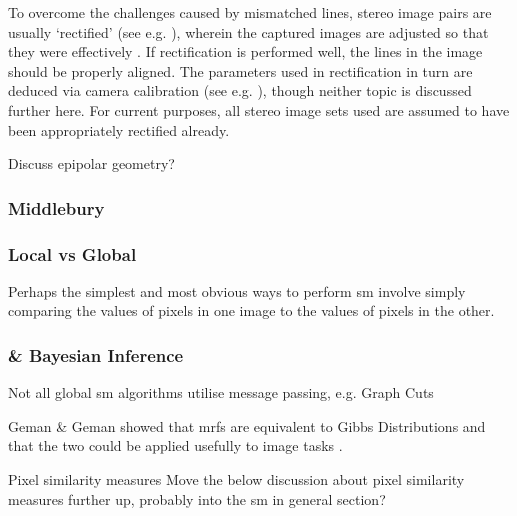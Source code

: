 To overcome the challenges caused by mismatched lines, stereo image pairs are usually `rectified' (see e.g. \cite[Ch. 1.5.1]{Wohler2013}), wherein the captured images are adjusted so that they were effectively .  If rectification is performed well, the lines in the image should be properly aligned.  The parameters used in rectification in turn are deduced via camera calibration (see e.g. \cite[Ch. 1.4]{Wohler2013}), though neither topic is discussed further here.  For current purposes, all stereo image sets used are assumed to have been appropriately rectified already.

\begin{anfxnote}{}
    Discuss epipolar geometry?
\end{anfxnote}

\subsubsection{Middlebury}

\subsubsection{Local vs Global}

Perhaps the simplest and most obvious ways to perform \gls{sm} involve simply comparing the values of pixels in one image to the values of pixels in the other.

\subsubsection{ \& Bayesian Inference}

Not all global \gls{sm} algorithms utilise message passing, e.g. Graph Cuts \cite{Kolmogorov2001,Tappen2003}

Geman \& Geman \cite{Geman1984} showed that \glspl{mrf} are equivalent to Gibbs Distributions and that the two could be applied usefully to image tasks \cite{Gimelfarb1999}.

\begin{anfxwarning}{Pixel similarity measures}
    Move the below discussion about pixel similarity measures further up, probably into the \gls{sm} in general section?
\end{anfxwarning}


